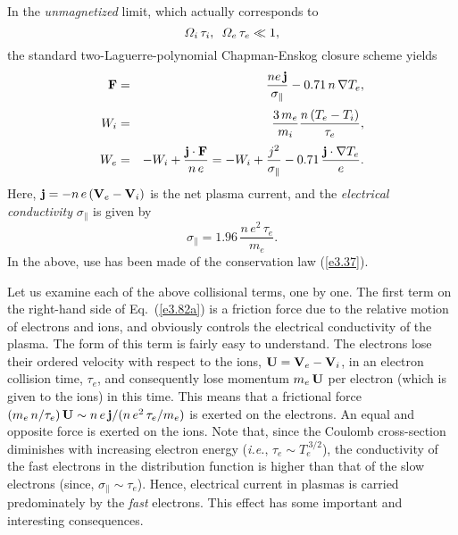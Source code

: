 In the {\em unmagnetized}\/ limit, which actually
corresponds to
\begin{equation}
{\mit\Omega}_i\,\tau_i, \,\,\,{\mit\Omega}_e\,\tau_e \ll 1,
\end{equation}
the standard two-Laguerre-polynomial Chapman-Enskog closure scheme yields
\begin{eqnarray}\label{e3.82a}
{\bf F} &=& \frac{ne\,{\bf j}}{\sigma_\parallel} - 0.71\,n\,\nabla T_e,\\[0.5ex]\label{e3.82b}
W_i &=& \frac{3\,m_e}{m_i} \frac{n\,(T_e-T_i)}{\tau_e},\\[0.5ex]
W_e &=& -W_i + \frac{ {\bf j}\cdot {\bf F} }{n \,e}= -W_i + 
\frac{j^2}{\sigma_\parallel} -
0.71\,\frac{{\bf j}\cdot \nabla T_e}{e}.\label{e3.82c}
\end{eqnarray}
Here, ${\bf j} = - n\,e\,({\bf V}_e-{\bf V}_i)$ is the net plasma current,
and the {\em electrical conductivity}\/ $\sigma_\parallel$ is given by
\begin{equation}\label{e3.83}
\sigma_\parallel = 1.96\,\frac{n \,e^2\,\tau_e}{m_e}.
\end{equation} In the above, use has been made of the conservation law
(\ref{e3.37}).

Let us examine each of the above collisional terms, one by one. The first
term on the right-hand side of Eq.~(\ref{e3.82a}) is a friction force due to the
relative motion of electrons and ions, and obviously controls the electrical
conductivity of the plasma. The form of this term is fairly easy to understand.
The electrons lose their ordered velocity
with respect to the ions,  ${\bf U} = {\bf V}_e - {\bf V}_i$,
in an electron collision time, $\tau_e$, and consequently lose momentum 
$m_e\,{\bf U}$  per electron (which is given to the ions) in this time. 
This means that a frictional force $(m_e\,n/\tau_e)\,{\bf U}
\sim n\,e\,{\bf j}/(n\,e^2\,\tau_e/m_e)$ is exerted on the electrons.
An equal and opposite force is exerted on the ions. Note that, since the Coulomb
cross-section diminishes with increasing electron energy ({\em i.e.}, 
$\tau_e\sim T_e^{~3/2}$),
the conductivity of the fast electrons in the distribution function
is higher than that of the slow electrons (since, $\sigma_\parallel \sim \tau_e$).
Hence, electrical current in plasmas is carried predominately by the
{\em fast}\/  electrons. This effect has some important and interesting
consequences. 

